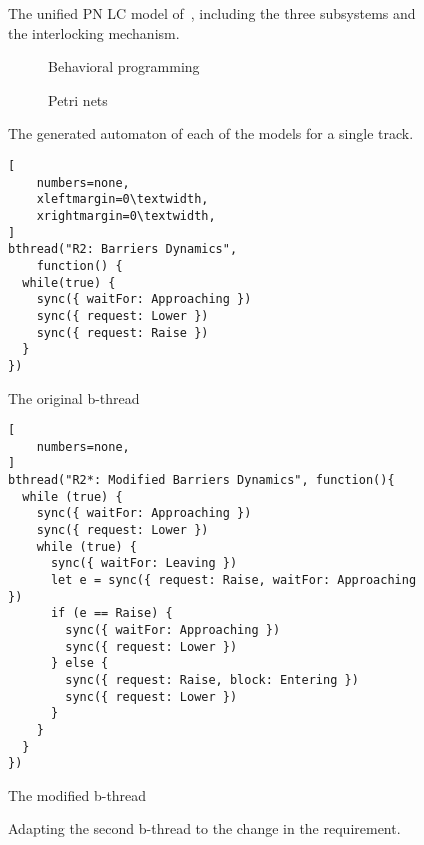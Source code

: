\documentclass[10pt,journal,compsoc]{IEEEtran}
\theoremstyle{definition}
\begin{document}
\begin{figure}
  \centering
{}
  \caption{The unified PN LC model of~\cite{leveson1987safety}, including the three subsystems and the interlocking mechanism.}
  \label{fig:ghazel-single} 
\end{figure}

\begin{figure*}
\centering
\begin{subfigure}{.3\textwidth}
  \begin{adjustbox}{width=\linewidth}
\end{adjustbox}
  \caption{Behavioral programming}
  \label{fig:sub-first}
\end{subfigure}\qquad\qquad\qquad\qquad\qquad
\begin{subfigure}{.3\textwidth}
  \begin{adjustbox}{width=\linewidth}
\end{adjustbox}
  \caption{Petri nets}
  \label{fig:sub-second}
\end{subfigure}
\caption{The generated automaton of each of the models for a single track.}
\label{fig:models_automata}
\end{figure*}


\begin{figure*}[tbph]
\captionsetup{type=lstlisting}
\begin{sublstlisting}[b]{0.35\linewidth}
\begin{lstlisting}[
    numbers=none,
    xleftmargin=0\textwidth,
    xrightmargin=0\textwidth,
]
bthread("R2: Barriers Dynamics", 
    function() {
  while(true) {
    sync({ waitFor: Approaching })
    sync({ request: Lower })
    sync({ request: Raise })
  }
})
\end{lstlisting}
\caption{The original b-thread}
\label{lst:bthread2:1}
\end{sublstlisting}\hfill
\begin{sublstlisting}[b]{0.6\linewidth}
\begin{lstlisting}[
    numbers=none,
]
bthread("R2*: Modified Barriers Dynamics", function(){
  while (true) {
    sync({ waitFor: Approaching })
    sync({ request: Lower })
    while (true) {
      sync({ waitFor: Leaving })
      let e = sync({ request: Raise, waitFor: Approaching })
      if (e == Raise) {
        sync({ waitFor: Approaching })
        sync({ request: Lower })
      } else {
        sync({ request: Raise, block: Entering })
        sync({ request: Lower })
      }
    }
  }
})
\end{lstlisting}
\caption{The modified b-thread}
\label{lst:bthread2:2}
\end{sublstlisting}
\caption{Adapting the second b-thread to the change in the requirement.}
\label{lst:bthread2}
\end{figure*}
\end{document}
